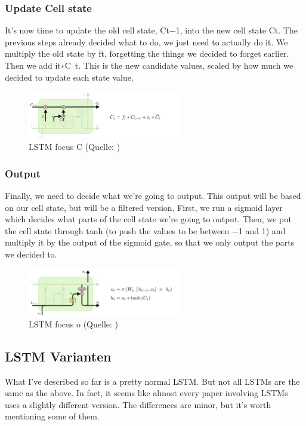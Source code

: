 {\subsubsection{Update Cell state}
It’s now time to update the old cell state, Ct−1, into the new cell state Ct. The previous steps already decided what to do, we just need to actually do it.
We multiply the old state by ft, forgetting the things we decided to forget earlier. Then we add it∗C~t. This is the new candidate values, scaled by how much we decided to update each state value.
\renewcommand{\figurename}{Abb.}
\begin{figure}[htp]
\centering
\includegraphics[width=0.60\textwidth]{pictures/LSTM3-focus-C.png}
\caption[LSTM focus C]{LSTM focus C (Quelle: \cite{OlahImg})}
\end{figure}

\subsubsection{Output}
Finally, we need to decide what we’re going to output. This output will be based on our cell state, but will be a filtered version. First, we run a sigmoid layer which decides what parts of the cell state we’re going to output. Then, we put the cell state through tanh (to push the values to be between −1 and 1) and multiply it by the output of the sigmoid gate, so that we only output the parts we decided to.
\renewcommand{\figurename}{Abb.}
\begin{figure}[htp]
\centering
\includegraphics[width=0.60\textwidth]{pictures/LSTM3-focus-o.png}
\caption[LSTM focus o]{LSTM focus o (Quelle: \cite{OlahImg})} 
\end{figure}


\subsection{LSTM Varianten}
What I’ve described so far is a pretty normal LSTM. But not all LSTMs are the same as the above. In fact, it seems like almost every paper involving LSTMs uses a slightly different version. The differences are minor, but it’s worth mentioning some of them.

}
